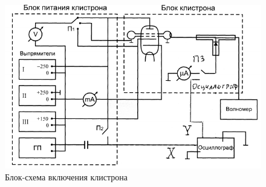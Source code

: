 \begin{figure}[h!]
	\centering
	\includegraphics[width=\textwidth]{fig/fig4}
	\caption{ Блок-схема включения клистрона}
	\label{fig:potential_well}
\end{figure}

